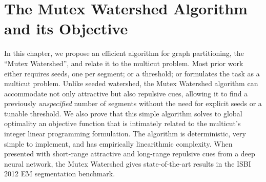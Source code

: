 
\chapter{The Mutex Watershed Algorithm and its Objective}\label{chapter:MWS}
In this chapter, we propose an efficient algorithm for graph partitioning, the ``Mutex Watershed'', and relate it to the multicut problem. 
Most prior work either requires seeds, one per segment; or a threshold; or formulates the task as a multicut problem. 
Unlike seeded watershed, the Mutex Watershed algorithm can accommodate not only attractive but also repulsive cues, allowing it to find a previously \emph{unspecified} number of segments without the need for explicit seeds or a tunable threshold. We also prove that this simple algorithm solves to global optimality an objective function that is intimately related to the multicut's integer linear programming formulation. 
The algorithm is deterministic, very simple to implement, and has empirically linearithmic complexity. 
When presented with short-range attractive and long-range repulsive cues from a deep neural network, the Mutex Watershed gives state-of-the-art results in the %
 ISBI 2012 EM segmentation benchmark.

